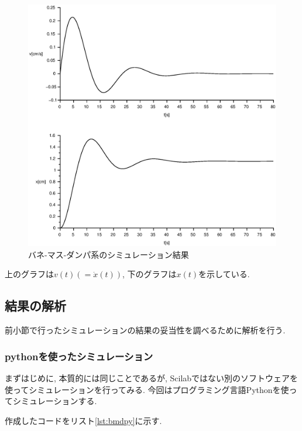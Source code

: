\documentclass[titlepage]{jsarticle}
\begin{document}
        \begin{figure}[h]
            \centering
            \includegraphics[width=15cm]{img/BMD.eps}
            \caption{バネ-マス-ダンパ系のシミュレーション結果}
            \label{fig:bmd}
        \end{figure}

        上のグラフは$v(t) (=\dot{x}(t))$, 下のグラフは$x(t)$を示している.
        
    \subsection{結果の解析}
        前小節で行ったシミュレーションの結果の妥当性を調べるために解析を行う.

        \subsubsection{pythonを使ったシミュレーション}
            まずはじめに, 本質的には同じことであるが,
            Scilabではない別のソフトウェアを使ってシミュレーションを行ってみる.
            今回はプログラミング言語Pythonを使ってシミュレーションする.

            作成したコードをリスト\ref{lst:bmdpy}に示す.
\end{document}
